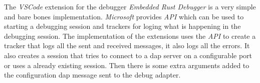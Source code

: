 The \emph{VSCode} extension for the debugger \emph{Embedded Rust Debugger} is a very simple and bare bones implementation.
\emph{Microsoft} provides \emph{API} which can be used to starting a debugging session and trackers for loging what is happening in the debugging session.
The implementation of the extensions uses the \emph{API} to create a tracker that logs all the sent and received messages, it also logs all the errors.
It also creates a session that tries to connect to a \acrshort{dap} server on a configurable port or uses a already existing session.
Then there is some extra arguments added to the configuration \acrshort{dap} message sent to the debug adapter.

